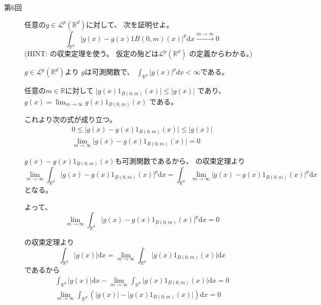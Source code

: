 \documentclass[12pt,b5paper]{ltjsarticle}
\begin{document}
\begin{description}
 \item [第6回]
      任意の$g\in \mathcal{L}^{p}(\mathbb{R}^{d})$に対して、
      次を証明せよ。
      \begin{equation}
       \int_{\mathbb{R}^{d}}
        \lvert g(x) - g(x)1{B(0,m)}(x) \rvert^{p}
        \mathrm{d}x
        \overset{m \to \infty}{\longrightarrow}
        0
      \end{equation}
      (HINT:  の収束定理を使う。
      仮定の殆どは$\mathcal{L}^{p}(\mathbb{R}^{d})$
      の定義からわかる。)

    \dotfill

    $g\in \mathcal{L}^{p}(\mathbb{R}^{d})$より
    $g$は可測関数で、
    $\int_{\mathbb{R}^{d}} \lvert g(x)\rvert^{p} dx < \infty$である。

    任意の$m \in \mathbb{R}$に対して
    $\lvert g(x)1_{B(0,m)}(x) \rvert \leq \lvert g(x) \rvert$
    であり、
    $\displaystyle g(x) = \lim_{m\to\infty} g(x)1_{B(0,m)}(x)$
    である。
    
    これより次の式が成り立つ。
    \begin{gather}
        0\leq
        \lvert g(x) - g(x)1_{B(0,m)}(x) \rvert
        \leq \lvert g(x) \rvert\\
        \lim_{m\to\infty}\lvert g(x) - g(x)1_{B(0,m)}(x) \rvert =0
    \end{gather}

    $g(x) - g(x)1_{B(0,m)}(x)$も可測関数であるから、
     の収束定理より
    \begin{equation}
        \lim_{m\to\infty}\int_{\mathbb{R}^{d}}
        \lvert g(x) - g(x)1_{B(0,m)}(x) \rvert^{p}
        \mathrm{d}x
        =
        \int_{\mathbb{R}^{d}} \lim_{m\to\infty}
        \lvert g(x) - g(x)1_{B(0,m)}(x) \rvert^{p}
        \mathrm{d}x
    \end{equation}
    となる。

    よって、
    \begin{equation}
        \lim_{m\to\infty}\int_{\mathbb{R}^{d}}
        \lvert g(x) - g(x)1_{B(0,m)}(x) \rvert^{p}
        \mathrm{d}x
        =0
    \end{equation}

     の収束定理より
    \begin{equation}
        \int_{\mathbb{R}^{d}} \lvert g(x) \rvert \mathrm{d}x
        =
        \lim_{m\to\infty}
        \int_{\mathbb{R}^{d}} \lvert g(x)1_{B(0,m)}(x) \rvert \mathrm{d}x
    \end{equation}
    であるから
    \begin{gather}
        \int_{\mathbb{R}^{d}} \lvert g(x) \rvert \mathrm{d}x
        -
        \lim_{m\to\infty}
        \int_{\mathbb{R}^{d}} \lvert g(x)1_{B(0,m)}(x) \rvert \mathrm{d}x =0\\
        \lim_{m\to\infty}\int_{\mathbb{R}^{d}}
        \left( \lvert g(x) \rvert - \lvert g(x)1_{B(0,m)}(x) \rvert \right)\mathrm{d}x =0
    \end{gather}


\end{description}
\end{document}
